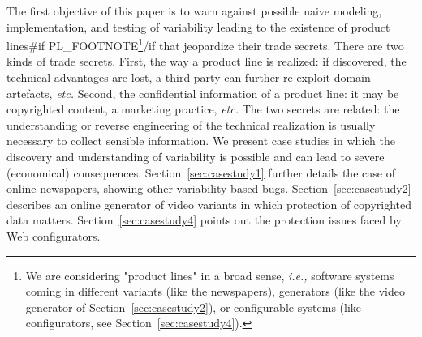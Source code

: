 \documentclass{sig-alternate}
\newcommand{\ie}{\emph{i.e.,}\xspace}
\newcommand{\etc}{\emph{etc.}\xspace}
\begin{document}
 The first objective of this paper is to warn against possible naive modeling, implementation, and testing of variability leading to the existence of product lines{{#if PL_FOOTNOTE}}\footnote{We are considering "product lines" in a broad sense, \ie software systems coming in different variants (like the newspapers), generators (like the video generator of Section~\ref{sec:casestudy2}), or configurable systems (like configurators, see Section~\ref{sec:casestudy4}).}{{/if}} that jeopardize their trade secrets.
 There are two kinds of trade secrets. First, the way a product line is realized: if discovered, the technical advantages are lost, a third-party can further re-exploit domain artefacts, \etc Second, the confidential information of a product line: it may be copyrighted content, a marketing practice, \etc The two secrets are related: the understanding or reverse engineering of the technical realization is usually necessary to collect sensible information.
% 
 We present case studies in which the discovery and understanding of variability is possible and can lead to severe (economical) consequences.
 Section~\ref{sec:casestudy1} further details the case of online newspapers, showing other variability-based bugs.
 Section~\ref{sec:casestudy2} describes an online generator of video variants in which protection of copyrighted data matters.
 Section~\ref{sec:casestudy4} points out the protection issues faced by Web configurators.



\end{document}
